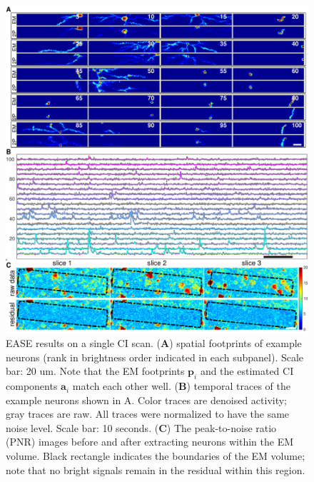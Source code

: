 \documentclass[10pt,letterpaper]{article}
\begin{document}
{\begin{figure}[t!]
	\centering
	\includegraphics[width=1\textwidth]{Figs/fig_example_scan_1.pdf}
	\caption{EASE results on a single CI scan. (\textbf{A}) spatial footprints of example neurons (rank in brightness order indicated in each subpanel). Scale bar: 20 um.  Note that the EM footprints $\bm{p}_i$ and the estimated CI components $\bm{a}_i$ match each other well.  (\textbf{B}) temporal traces of the example neurons shown in A. Color traces are denoised activity; gray traces are raw.  All traces were normalized to have the same noise level. Scale bar: 10 seconds. (\textbf{C}) The peak-to-noise ratio (PNR) images before and after extracting neurons within the EM volume. Black rectangle indicates the boundaries of the EM volume;  note that no bright signals remain in the residual within this region.}
\label{fig:cn_pnr}
\end{figure}


}
\end{document}
